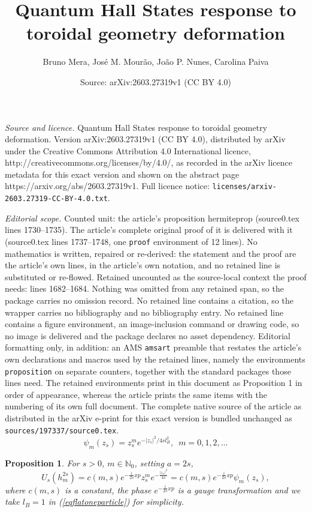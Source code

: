 \documentclass[10pt,a4paper]{amsart}
\title{Quantum Hall States response to toroidal geometry deformation}
\author{Bruno Mera, Jos\'e M. Mour\~ao, Jo\~ao P. Nunes, Carolina Paiva}
\date{Source: arXiv:2603.27319v1 (CC BY 4.0)}
\newtheorem{proposition}{Proposition}
\begin{document}
\maketitle

\noindent\emph{Source and licence.} Quantum Hall States response to toroidal geometry deformation. Version arXiv:2603.27319v1 (CC BY 4.0), distributed by arXiv under the Creative Commons Attribution 4.0 International licence, http://creativecommons.org/licenses/by/4.0/, as recorded in the arXiv licence metadata for this exact version and shown on the abstract page https://arxiv.org/abs/2603.27319v1. Full licence notice: \texttt{licenses/arxiv-2603.27319-CC-BY-4.0.txt}.\par\smallskip

\noindent\textit{Editorial scope.} Counted unit: the article's proposition hermiteprop (source0.tex lines 1730--1735). The article's complete original proof of it is delivered with it (source0.tex lines 1737--1748, one \texttt{proof} environment of 12 lines). No mathematics is written, repaired or re-derived: the statement and the proof are the article's own lines, in the article's own notation, and no retained line is substituted or re-flowed.  Retained uncounted as the source-local context the proof needs: lines 1682--1684.  Nothing was omitted from any retained span, so the package carries no omission record.  No retained line contains a citation, so the wrapper carries no bibliography and no bibliography entry.  No retained line contains a figure environment, an image-inclusion command or drawing code, so no image is delivered and the package declares no asset dependency.  Editorial formatting only, in addition: an AMS \texttt{amsart} preamble that restates the article's own declarations and macros used by the retained lines, namely the environments \texttt{proposition} on separate counters, together with the standard packages those lines need.  The retained environments print in this document as Proposition 1 in order of appearance, whereas the article prints the same items with the numbering of its own full document.  The complete native source of the article as distributed in the arXiv e-print for this exact version is bundled unchanged as \texttt{sources/197337/source0.tex}.
\begin{equation}\label{eqflatoneparticle}
\psi_m(z_s) = z_s^m e^{-\vert z_s\vert^2/ 4sl_B^2},\,\,\,  m=0,1, 2, \dots     
\end{equation}

\begin{proposition}\label{hermiteprop}For $s>0$, $m\in \mathbb{N}_0$, setting $a=2s$,
$$
    U_s \left(h_m^{2s}\right) = c(m,s)  e^{-\frac{i}{2s}xp}z_s^m e^{-\frac{\vert z_s\vert^2}{4s}} = c(m,s) e^{-\frac{i}{2s}xp} \psi_m (z_s), 
$$
where $c(m,s)$ is a constant, the phase $e^{-\frac{i}{2s}xp}$ is a gauge transformation and we take $l_B=1$ in (\ref{eqflatoneparticle}) for simplicity.
\end{proposition}
\end{document}
